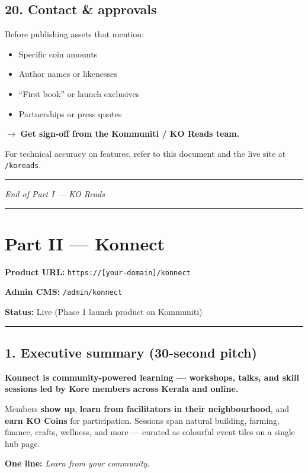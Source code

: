 \documentclass[11pt,a4paper]{report}
\begin{document}
\subsection{20. Contact \& approvals}

Before publishing assets that mention:

\begin{itemize}
  \item Specific coin amounts
  \item Author names or likenesses
  \item “First book” or launch exclusives
  \item Partnerships or press quotes
\end{itemize}

$\rightarrow$ \textbf{Get sign-off from the Kommuniti / KO Reads team.}


For technical accuracy on features, refer to this document and the live site at \texttt{/koreads}.


\medskip\hrule\medskip

\textit{End of Part I --- KO Reads}

\medskip\hrule\medskip

\section{Part II --- Konnect}

\textbf{Product URL:} \texttt{https://[your-domain]/konnect}

\textbf{Admin CMS:} \texttt{/admin/konnect}

\textbf{Status:} Live (Phase 1 launch product on Kommuniti)


\medskip\hrule\medskip

\subsection{1. Executive summary (30-second pitch)}

\textbf{Konnect is community-powered learning --- workshops, talks, and skill sessions led by Kore members across Kerala and online.}


Members \textbf{show up}, \textbf{learn from facilitators in their neighbourhood}, and \textbf{earn KO Coins} for participation. Sessions span natural building, farming, finance, crafts, wellness, and more --- curated as colourful event tiles on a single hub page.


\textbf{One line:} \textit{Learn from your community.}
\end{document}
